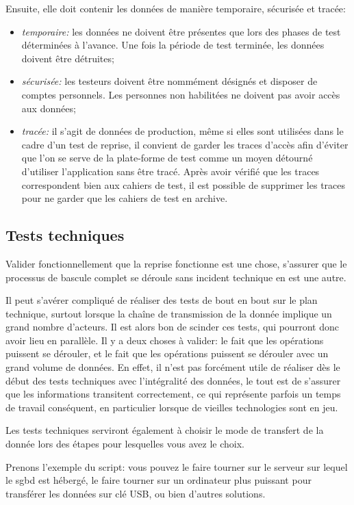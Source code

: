 \documentclass{book}
\begin{document}
Ensuite, elle doit contenir les données de manière temporaire, sécurisée et tracée:
\begin{itemize}
 \item \textit{temporaire:} les données ne doivent être présentes que lors des phases de test déterminées à l'avance. Une fois la période de test terminée, les données doivent être détruites;
 \item \textit{sécurisée:} les testeurs doivent être nommément désignés et disposer de comptes personnels. Les personnes non habilitées ne doivent pas avoir accès aux données;
 \item \textit{tracée:} il s'agit de données de production, même si elles sont utilisées dans le cadre d'un test de reprise, il convient de garder les traces d'accès afin d'éviter que l'on se serve de la plate-forme de test comme un moyen détourné d'utiliser l'application sans être tracé. Après avoir vérifié que les traces correspondent bien aux cahiers de test, il est possible de supprimer les traces pour ne garder que les cahiers de test en archive.
\end{itemize}

\subsection{Tests techniques}

Valider fonctionnellement que la reprise fonctionne est une chose, s'assurer que le processus de bascule complet se déroule sans incident technique en est une autre.

Il peut s'avérer compliqué de réaliser des tests de bout en bout sur le plan technique, surtout lorsque la chaîne de transmission de la donnée implique un grand nombre d'acteurs. Il est alors bon de scinder ces tests, qui pourront donc avoir lieu en parallèle. Il y a deux choses à valider: le fait que les opérations puissent se dérouler, et le fait que les opérations puissent se dérouler avec un grand volume de données. En effet, il n'est pas forcément utile de réaliser dès le début des tests techniques avec l'intégralité des données, le tout est de s'assurer que les informations transitent correctement, ce qui représente parfois un temps de travail conséquent, en particulier lorsque de vieilles technologies sont en jeu.

Les tests techniques serviront également à choisir le mode de transfert de la donnée lors des étapes pour lesquelles vous avez le choix.

Prenons l'exemple du script: vous pouvez le faire tourner sur le serveur sur lequel le \gls{sgbd} est hébergé, le faire tourner sur un ordinateur plus puissant pour transférer les données sur clé USB, ou bien d'autres solutions.
\end{document}
